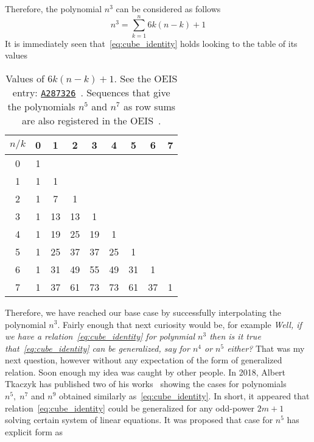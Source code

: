 Therefore, the polynomial $n^3$ can be considered as follows
\begin{equation}
    \label{eq:cube_identity}
    n^3 = \sum_{k=1}^{n} 6k(n-k) + 1
\end{equation}
It is immediately seen that~\eqref{eq:cube_identity} holds looking to the table of its values
\begin{table}[H]
    \setlength\extrarowheight{-6pt}
    \begin{tabular}{c|cccccccc}
        $n/k$ & 0 & 1  & 2  & 3  & 4  & 5  & 6  & 7 \\
        \hline
        0     & 1 &    &    &    &    &    &    &   \\
        1     & 1 & 1  &    &    &    &    &    &   \\
        2     & 1 & 7  & 1  &    &    &    &    &   \\
        3     & 1 & 13 & 13 & 1  &    &    &    &   \\
        4     & 1 & 19 & 25 & 19 & 1  &    &    &   \\
        5     & 1 & 25 & 37 & 37 & 25 & 1  &    &   \\
        6     & 1 & 31 & 49 & 55 & 49 & 31 & 1  &   \\
        7     & 1 & 37 & 61 & 73 & 73 & 61 & 37 & 1
    \end{tabular}
    \caption{Values of $6k(n-k) + 1$.
    See the OEIS entry: \href{https://oeis.org/A287326}{\texttt{A287326}}~\cite{kolosov2017third}.
    Sequences that give the polynomials $n^{5}$ and $n^7$ as row sums
    are also registered in the OEIS~\cite{kolosov2018fifth, kolosov2018seventh}.
    }
    \label{tab:fig_1}
\end{table}
Therefore, we have reached our base case by successfully interpolating the polynomial $n^3$.
Fairly enough that next curiosity would be, for example
\textit{Well, if we have a relation~\eqref{eq:cube_identity}
for polynmial $n^3$ then is it true that~\eqref{eq:cube_identity} can be generalized, say for $n^4$ or $n^5$ either?}
That was my next question, however without any expectation of the form of generalized relation.
Soon enough my idea was caught by other people.
In 2018, Albert Tkaczyk has published two of his works~\cite{tkaczyk2018problem, tkaczyk2018continuation}
showing the cases for polynomials $n^5, \; n^7$ and $n^9$ obtained similarly as~\eqref{eq:cube_identity}.
In short, it appeared that relation~\eqref{eq:cube_identity} could be generalized
for any odd-power $2m+1$ solving certain system of linear equations.
It was proposed that case for $n^5$ has explicit form as
